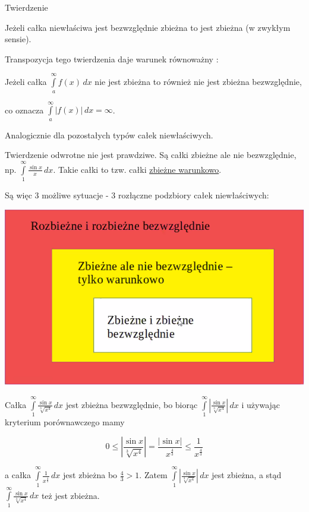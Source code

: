\begin{tw}{Twierdzenie}

Jeżeli całka niewłaściwa jest bezwzględnie zbieżna to jest zbieżna (w zwykłym sensie).

Transpozycja tego twierdzenia daje warunek równoważny : 

Jeżeli całka $ \int\limits_{a}^{\infty} f(x) \,dx $ nie jest zbieżna to również nie jest zbieżna bezwzględnie,

co oznacza $ \int\limits_{a}^{\infty} |f(x)| \,dx = \infty $.

Analogicznie dla pozostałych typów całek niewłaściwych. \\
\end{tw}

Twierdzenie odwrotne nie jest prawdziwe. Są całki zbieżne ale nie bezwzględnie, np. $ \int\limits_{1}^{\infty} \frac{\sin x}{x} \,dx $.
Takie całki to tzw. całki \underline{zbieżne warunkowo}.

Są więc 3 możliwe sytuacje - 3 rozłączne podzbiory całek niewłaściwych:

\begin{center}
\includegraphics[scale=0.6]{img/rozbiezneirozbiezne.png}
\end{center}

\begin{przyklad}

Całka $ \int\limits_{1}^{\infty} \frac{\sin x}{\sqrt[3]{x^4}} \,dx $ jest zbieżna bezwzględnie, bo biorąc
$ \int\limits_{1}^{\infty} \left| \frac{\sin x}{\sqrt[3]{x^4}} \right| \,dx $ i używając kryterium porównawczego mamy

$$ 0 \leq \left| \frac{\sin x}{\sqrt[3]{x^4}} \right| = \frac{|\sin x|}{x^{\frac{4}{3}}} \leq \frac{1}{x^{\frac{4}{3}}} $$

a całka $ \int\limits_{1}^{\infty} \frac{1}{x^{\frac{4}{3}}} \,dx $ jest zbieżna bo $ \frac{4}{3} > 1 $.
Zatem $ \int\limits_{1}^{\infty} \left| \frac{\sin x}{\sqrt[3]{x^4}} \right| \,dx $ jest zbieżna, a stąd
$ \int\limits_{1}^{\infty} \frac{\sin x}{\sqrt[3]{x^4}} \,dx $ też jest zbieżna.
\end{przyklad}